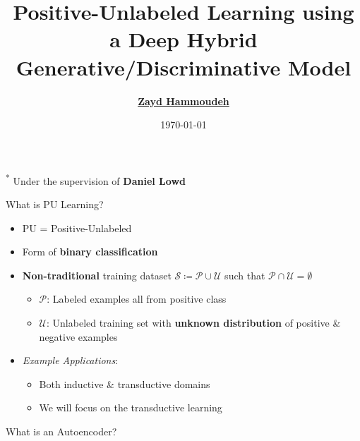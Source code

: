 \documentclass[11pt,dvipsnames,usenames,aspectratio=169]{beamer}  %
\title[Deep Positive-Unlabeled Learning]{Positive-Unlabeled Learning using a Deep Hybrid Generative/Discriminative Model}
\author[Zayd Hammoudeh]{%
  \href{mailto:zayd@cs.uoregon.edu}{\textbf{Zayd Hammoudeh}}\inst{1\textsuperscript{*}}  %
}
\institute[Univ.\ Oregon]{%
  \textsuperscript{1}\textbf{University of Oregon}\\
  Eugene, OR, USA\\
  \texttt{\href{mailto:zayd@cs.uoregon.edu}{zayd@cs.uoregon.edu}}
}
\date{\today}
\DeclarePairedDelimiter{\norm}{\lVert}{\rVert}
\newcommand{\pos}{\mathcal{P}}
\newcommand{\unlabel}{\mathcal{U}}
\newcommand{\blue}[1]{{\color{Blue} #1}}
\newcommand{\red}[1]{{\color{red} #1}}
\newcommand{\green}[1]{{\color{ForestGreen} #1}}
\begin{document}
\begin{frame}
  \titlepage

  \begin{center}
    \textsuperscript{*} Under the supervision of \textbf{Daniel Lowd}
  \end{center}
\end{frame}

\begin{frame}{What is PU Learning?}
  \begin{itemize}[<+->]
    \setlength{\itemsep}{14pt}
    \item PU = Positive-Unlabeled
    \item Form of \blue{\textbf{binary classification}}
    \item \green{\textbf{Non-traditional}} training dataset $\mathcal{S} \coloneqq \pos \cup \unlabel$ such that $\pos \cap \unlabel = \emptyset$
      \begin{itemize}[<+->]
        \item $\pos$: Labeled examples all from positive class
        \item $\unlabel$: Unlabeled training set with \blue{\textbf{unknown distribution}} of positive \& negative examples
      \end{itemize}
    \item \textit{Example Applications}: %
      \begin{itemize}[<+->]
        \item Both \blue{inductive} \& \red{transductive} domains
        \item We will focus on the \red{transductive} learning
      \end{itemize}
  \end{itemize}
\end{frame}

\begin{frame}{What is an Autoencoder?}

  \vspace{14pt}
  
\end{frame}
\end{document}
